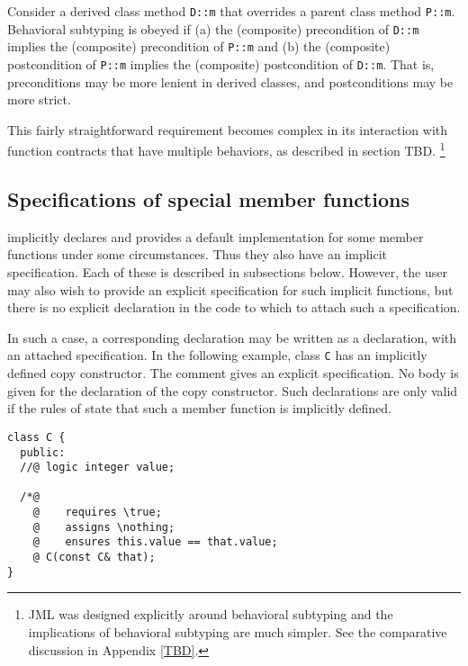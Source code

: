 Consider a derived class method \lstinline|D::m| that overrides a parent class method \lstinline|P::m|.
Behavioral subtyping is obeyed if (a) the (composite) precondition of
\lstinline|D::m| implies the (composite) precondition of 
\lstinline|P::m| and (b) the (composite) postcondition of
\lstinline|P::m| implies the (composite) postcondition of 
\lstinline|D::m|. That is, preconditions may be more lenient in derived classes, and postconditions may be more strict. 

This fairly straightforward requirement becomes complex in its interaction with function contracts that have multiple behaviors, 
as described in section TBD.
\footnote{JML was designed explicitly around behavioral subtyping and the implications of behavioral subtyping are much simpler. 
	See the comparative discussion in Appendix \ref{TBD}.}


\subsection{Specifications of special member functions}

\lang{} implicitly declares and provides a default implementation for some member functions under some circumstances. 
Thus they also have an implicit specification. Each of these is described in subsections below. However, the user may also wish to provide an explicit specification for such implicit functions, but there is no
explicit declaration in the \lang{} code to which to attach such a 
specification.

In such a case, a corresponding declaration may be written as a \NAME{} 
declaration, with an attached specification. 
In the following example, class \lstinline|C| has an implicitly defined
copy constructor. The \NAME{} comment gives an explicit specification.
No body is given for the declaration of the \lang{} copy constructor.
Such declarations are only valid if the rules of \lang{} state that such
a member function is implicitly defined.
\begin{lstlisting}
class C {
  public:
  //@ logic integer value;
  
  /*@
    @    requires \true;
    @    assigns \nothing;
    @    ensures this.value == that.value;
    @ C(const C& that);
}
\end{lstlisting}

